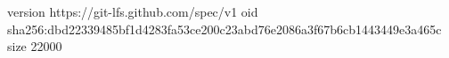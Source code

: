 version https://git-lfs.github.com/spec/v1
oid sha256:dbd22339485bf1d4283fa53ce200c23abd76e2086a3f67b6cb1443449e3a465c
size 22000
